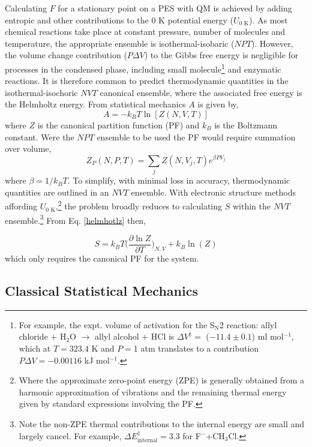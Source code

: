 \documentclass[../main.tex]{subfiles}
\begin{document}
Calculating $F$ for a stationary point on a PES with QM is achieved by adding  entropic and other contributions to the 0 K potential energy ($U_\text{0 K}$). As most chemical reactions take place at constant pressure, number of molecules and temperature, the appropriate ensemble is isothermal-isobaric ($NPT$). However, the volume change contribution ($P\Delta V$) to the Gibbs free energy is negligible for processes in the condensed phase, including small molecule\footnote{For example, the expt. \cite{Lateef1969} volume of activation for the S$_\text{N}$2 reaction: allyl chloride + H$_2$O $\rightarrow$ allyl alcohol + HCl is $\Delta V^\ddagger = $ ($-11.4 \pm 0.1$) ml mol$^{-1}$, which at $T = 323.4$ K and $P = $1 atm translates to a contribution $P\Delta V = -0.00116$ kJ mol$^{-1}$.} and enzymatic reactions.\cite{Low1975} It is therefore common to predict thermodynamic quantities in the isothermal-isochoric $NVT$ canonical ensemble, where the associated free energy is the Helmholtz energy. From statistical mechanics $A$ is given by,\cite{mcquarrie200}
\begin{equation}
A = -k_B T \ln[Z(N, V, T)]
\label{helmhotlz}
\end{equation}
where $Z$ is the canonical partition function (PF) and $k_B$ is the Boltzmann constant. Were the $NPT$ ensemble to be used the PF would require summation over volume, 
\begin{equation}
Z_P(N, P, T) =  \sum_j Z(N, V_j, T) e^{\beta P V_j}
\end{equation}
where $\beta = 1 / k_B T$. To simplify, with minimal loss in accuracy, thermodynamic quantities are outlined in an $NVT$ ensemble. With electronic structure methods affording $U_{0\text{ K}}$,\footnote{Where the approximate zero-point energy (ZPE) is generally obtained from a harmonic approximation of vibrations and the remaining thermal energy given by standard expressions involving the PF.} the problem broadly reduces to calculating $S$ within the $NVT$ ensemble.\footnote{Note the non-ZPE thermal contributions to the internal energy are small and largely cancel. For example, $\Delta E_\text{internal}^\ddagger = 3.3$ \kcalx for F${}^{-}$+CH${}_3$Cl.} From Eq. \ref{helmhotlz} then,

\begin{equation}
S = k_B T {\Big (} \frac{\partial \ln Z}{\partial T} {\Big )}_{N, V} + k_B \ln(Z)
\label{entropy_Z}
\end{equation}
which only requires the canonical PF for the system.

\subsection{Classical Statistical Mechanics}
\end{document}
